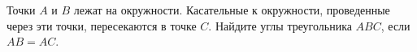 \begin{ex}
	\begin{condition}
		Точки \( A  \) и \( B  \) лежат на окружности. Касательные к окружности, проведенные через эти точки, пересекаются в точке \( C \). Найдите углы треугольника \( ABC \), если \( AB = AC \).
	\end{condition}
\end{ex}